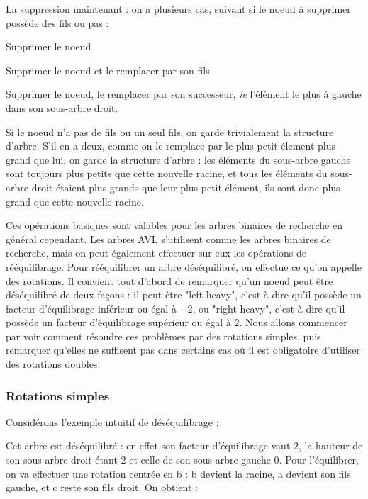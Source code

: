 \documentclass{article}
\begin{document}
La suppression maintenant : on a plusieurs cas, suivant si le noeud à supprimer possède des fils ou pas :

\begin{algorithmic}

Supprimer le noeud


Supprimer le noeud et le remplacer par son fils

\Else

Supprimer le noeud, le remplacer par son successeur, \textit{ie} l'élément le plus à gauche dans son sous-arbre droit.
\EndIf
\end{algorithmic}
Si le noeud n'a pas de fils ou un seul fils, on garde trivialement la structure d'arbre. S'il en a deux, comme on le remplace par le plus petit élement plus grand que lui, on garde la structure d'arbre : les éléments du sous-arbre gauche sont toujours plus petits que cette nouvelle racine, et tous les éléments du sous-arbre droit étaient plus grands que leur plus petit élément, ils sont donc plus grand que cette nouvelle racine.

Ces opérations basiques sont valables pour les arbres binaires de recherche en général cependant. Les arbres AVL s'utilisent comme les arbres binaires de recherche, mais on peut également effectuer sur eux les opérations de rééquilibrage. Pour rééquilibrer 
un arbre déséquilibré, on effectue ce qu'on appelle des rotations. Il convient tout d'abord de remarquer qu'un noeud peut être déséquilibré de deux façons : il peut 
être "left heavy", c'est-à-dire qu'il possède un facteur d'équilibrage inférieur ou égal à $-2$, ou "right heavy", c'est-à-dire qu'il possède un facteur 
d'équilibrage supérieur ou égal à $2$. Nous allons commencer par voir comment résoudre ces problèmes par des rotations simples, puis remarquer qu'elles ne suffisent pas 
dans certains cas où il est obligatoire d'utiliser des rotations doubles.

\subsubsection{Rotations simples}
Considérons l'exemple intuitif de déséquilibrage :

Cet arbre est déséquilibré : en effet son facteur d'équilibrage vaut $2$, la hauteur de son sous-arbre droit étant $2$ et celle de son sous-arbre gauche $0$. Pour l'équilibrer, on va effectuer une rotation centrée en b : b devient la racine, a devient son fils gauche, et c reste son fils droit. On obtient :
\end{document}
